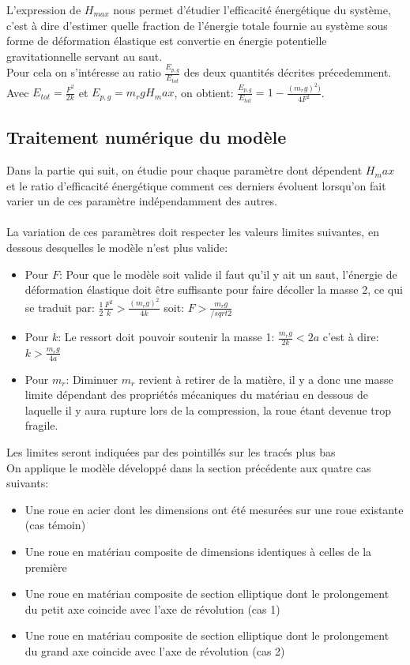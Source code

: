 L'expression de $H_{max}$ nous permet d'étudier l'efficacité énergétique du système, c'est à dire d'estimer quelle fraction de l'énergie totale fournie au système sous forme de déformation élastique est convertie en énergie potentielle gravitationnelle servant au saut. \\
Pour cela on s'intéresse au ratio $\frac{E_{p,g}}{E_{tot}}$ des deux quantités décrites précedemment. \\
Avec $E_{tot}=\frac{F^2}{2k}$ et $E_{p,g}=m_r g H_max$, on obtient:  $\frac{E_{p,g}}{E_{tot}}=1-\frac{(m_r g)^2)}{4F^2}$.

\subsection{Traitement numérique du modèle}
Dans la partie qui suit, on étudie pour chaque paramètre dont dépendent $H_max$ et le ratio d'efficacité énergétique comment ces derniers évoluent lorsqu'on fait varier un de ces paramètre indépendamment des autres.
\\ 
\\ 
La variation de ces paramètres doit respecter les valeurs limites suivantes, en dessous desquelles le modèle n'est plus valide:
\begin{itemize}
    \item Pour $F$: Pour que le modèle soit valide il faut qu’il y ait un saut, l'énergie de déformation élastique doit être suffisante pour faire décoller la masse 2, ce qui se traduit par: $\frac{1}{2} \frac{F^2}{k}>\frac{(m_r g)^2}{4k}$  soit: $F>\frac{m_r g}{/sqrt{2}}$
    \item Pour $k$: Le ressort doit pouvoir soutenir la masse 1: $\frac{m_r g}{2k}<2a$ c'est à dire: $k>\frac{m_r g}{4a}$ 
    \item Pour $m_r$: Diminuer $m_r$ revient à retirer de la matière, il y a donc une masse limite dépendant des propriétés mécaniques du matériau en dessous de laquelle il y aura rupture lors de la compression, la roue étant devenue trop fragile.
\end{itemize}
Les limites seront indiquées par des pointillés sur les tracés plus bas
\\
On applique le modèle développé dans la section précédente aux quatre cas suivants:
\begin{itemize}
	\item Une roue en acier dont les dimensions ont été mesurées sur une roue existante (cas témoin)
	\item Une roue en matériau composite de dimensions identiques à celles de la première
	\item Une roue en matériau composite de section elliptique dont le prolongement du petit axe coincide avec l'axe de révolution (cas 1)
	\item Une roue en matériau composite de section elliptique dont le prolongement du grand axe coincide avec l'axe de révolution (cas 2)
\end{itemize}
\\
\\

